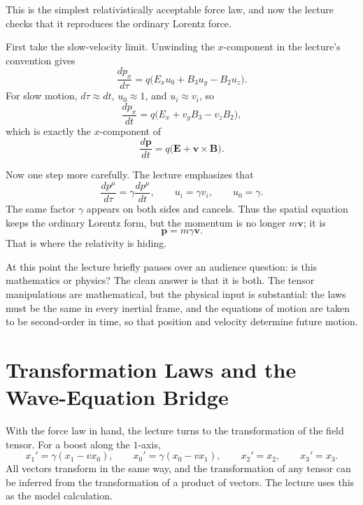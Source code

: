 This is the simplest relativistically acceptable force law, and now the lecture checks that it reproduces the ordinary Lorentz force.

First take the slow-velocity limit. Unwinding the \(x\)-component in the lecture's convention gives
\begin{equation}
\frac{dp_x}{d\tau}
=
q\bigl(E_x u_0 + B_3 u_y - B_2 u_z\bigr).
\end{equation}
For slow motion, \(d\tau \approx dt\), \(u_0 \approx 1\), and \(u_i \approx v_i\), so
\begin{equation}
\frac{dp_x}{dt}
=
q\bigl(E_x + v_y B_3 - v_z B_2\bigr),
\end{equation}
which is exactly the \(x\)-component of
\begin{equation}
\frac{d\mathbf p}{dt}
=
q\bigl(\mathbf E + \mathbf v \times \mathbf B\bigr).
\end{equation}

Now one step more carefully. The lecture emphasizes that
\begin{equation}
\frac{dp^\mu}{d\tau}
=
\gamma \frac{dp^\mu}{dt},
\qquad
u_i=\gamma v_i,
\qquad
u_0=\gamma.
\end{equation}
The same factor \(\gamma\) appears on both sides and cancels. Thus the spatial equation keeps the ordinary Lorentz form, but the momentum is no longer \(m\mathbf v\); it is
\begin{equation}
\mathbf p = m\gamma \mathbf v.
\end{equation}
That is where the relativity is hiding.

At this point the lecture briefly pauses over an audience question: is this mathematics or physics? The clean answer is that it is both. The tensor manipulations are mathematical, but the physical input is substantial: the laws must be the same in every inertial frame, and the equations of motion are taken to be second-order in time, so that position and velocity determine future motion.

\section{Transformation Laws and the Wave-Equation Bridge}

With the force law in hand, the lecture turns to the transformation of the field tensor. For a boost along the \(1\)-axis,
\begin{equation}
x_1'=\gamma(x_1-vx_0),
\qquad
x_0'=\gamma(x_0-vx_1),
\qquad
x_2'=x_2,
\qquad
x_3'=x_3.
\end{equation}
All vectors transform in the same way, and the transformation of any tensor can be inferred from the transformation of a product of vectors. The lecture uses this as the model calculation.

